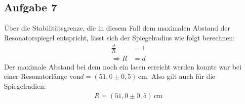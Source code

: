 \subsection{Aufgabe 7}
Über die Stabilitätsgrenze, die in diesem Fall dem maximalen Abstand der Resonatorspiegel entspricht, lässt sich der Spiegelradius wie folgt berechnen:
\begin{align}
\frac{d}{R} &= 1 \\
\Rightarrow R &= d
\end{align}
Der maximale Abstand bei dem noch ein lasen erreicht werden konnte war bei einer Resonatorlänge von$d = (51,0 \pm 0,5)\, \text{cm}$.
Also gilt auch für die Spiegelradien:
\begin{align}
R = (51,0 \pm 0,5)\, \text{cm}
\end{align}
